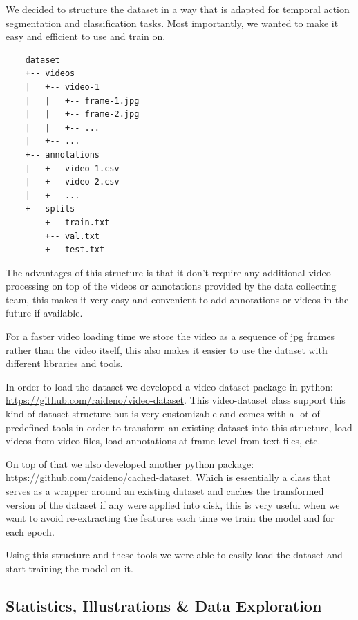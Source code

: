 We decided to structure the dataset in a way that is adapted for temporal action segmentation and classification tasks. Most importantly, we wanted to make it easy and efficient to use and train on.

\begin{verbatim}
    dataset
    +-- videos
    |   +-- video-1
    |   |   +-- frame-1.jpg
    |   |   +-- frame-2.jpg
    |   |   +-- ...
    |   +-- ...
    +-- annotations
    |   +-- video-1.csv
    |   +-- video-2.csv
    |   +-- ...
    +-- splits
        +-- train.txt
        +-- val.txt
        +-- test.txt
\end{verbatim}

The advantages of this structure is that it don't require any additional video processing on top of the videos or annotations provided by the data collecting team, this makes it very easy and convenient to add annotations or videos in the future if available.

For a faster video loading time we store the video as a sequence of jpg frames rather than the video itself, this also makes it easier to use the dataset with different libraries and tools.

In order to load the dataset we developed a video dataset package in python: \href{https://github.com/raideno/video-dataset}{https://github.com/raideno/video-dataset}. This video-dataset class support this kind of dataset structure but is very customizable and comes with a lot of predefined tools in order to transform an existing dataset into this structure, load videos from video files, load annotations at frame level from text files, etc.

On top of that we also developed another python package: \href{https://github.com/raideno/cached-dataset}{https://github.com/raideno/cached-dataset}. Which is essentially a class that serves as a wrapper around an existing dataset and caches the transformed version of the dataset if any were applied into disk, this is very useful when we want to avoid re-extracting the features each time we train the model and for each epoch.

Using this structure and these tools we were able to easily load the dataset and start training the model on it.

\subsection{Statistics, Illustrations \& Data Exploration}

